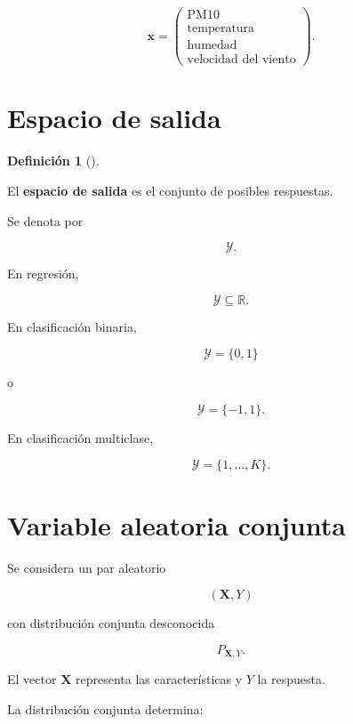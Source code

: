 \documentclass[
  spanish,
  10.5pt,
  letterpaper,
  DIV=11,
  numbers=noendperiod,
  oneside,
  open=any]{scrreprt}
\theoremstyle{definition}
\newtheorem{definition}{Definición}[chapter]
\theoremstyle{definition}
\theoremstyle{plain}
\theoremstyle{remark}
\begin{document}
\[
\mathbf{x}
=
\begin{pmatrix}
\text{PM10}\\
\text{temperatura}\\
\text{humedad}\\
\text{velocidad del viento}
\end{pmatrix}.
\]

\section*{Espacio de salida}\label{espacio-de-salida}


\begin{definition}[]\protect\hypertarget{def-espacio-salida}{}\label{def-espacio-salida}

El \textbf{espacio de salida} es el conjunto de posibles respuestas.

\end{definition}

Se denota por

\[
\mathcal{Y}.
\]

En regresión,

\[
\mathcal{Y}\subseteq\mathbb{R}.
\]

En clasificación binaria,

\[
\mathcal{Y}=\{0,1\}
\]

o

\[
\mathcal{Y}=\{-1,1\}.
\]

En clasificación multiclase,

\[
\mathcal{Y}
=
\{1,\ldots,K\}.
\]

\section*{Variable aleatoria
conjunta}\label{variable-aleatoria-conjunta}


Se considera un par aleatorio

\[
(\mathbf{X},Y)
\]

con distribución conjunta desconocida

\[
P_{\mathbf{X},Y}.
\]

El vector \(\mathbf{X}\) representa las características y \(Y\) la
respuesta.

La distribución conjunta determina:
\end{document}
